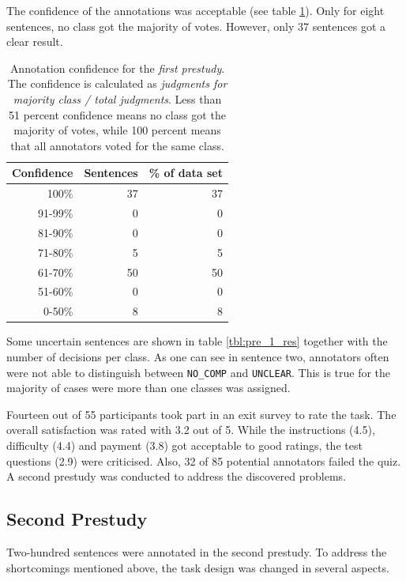 The confidence of the annotations was acceptable (see table \ref{fig:pre_a_agg}). Only for eight sentences, no class got the majority of votes. However, only 37 sentences got a clear result.

\begin{table}[htbp]
\caption{Annotation confidence for the \emph{first prestudy}. The confidence is calculated as \emph{judgments for majority class / total judgments}. Less than 51 percent confidence means no class got the majority of votes, while 100 percent means that all annotators voted for the same class.}
\label{fig:pre_a_agg}
\begin{tabularx}{\textwidth}{rrr}
\toprule
Confidence & Sentences & \% of data set \\
\midrule
100\%	&	37	&	37	 \\ 
91-99\%	&	0	&	0	 \\ 
81-90\%	&	0	&	0	 \\ 
71-80\%	&	5	&	5	 \\ 
61-70\%	&	50	&	50	 \\ 
51-60\%	&	0	&	0	 \\ 
0-50\%	&	8	&	8	 \\ 
\bottomrule
\end{tabularx}
\end{table}




Some uncertain sentences are shown in table \ref{tbl:pre_1_res} together with the number of decisions per class. As one can see in sentence two, annotators often were not able to distinguish between \texttt{NO\_COMP} and \texttt{UNCLEAR}. This is true for the majority of cases were more than one classes was assigned.



Fourteen out of 55 participants took part in an exit survey to rate the task. The overall satisfaction was rated with 3.2 out of 5. While the instructions (4.5), difficulty (4.4) and payment (3.8) got acceptable to good ratings, the test questions (2.9) were criticised. Also, 32 of 85 potential annotators failed the quiz. A second prestudy was conducted to address the discovered problems.


\FloatBarrier
\subsection{Second Prestudy}
Two-hundred sentences were annotated in the second prestudy. To address the shortcomings mentioned above, the task design was changed in several aspects.

